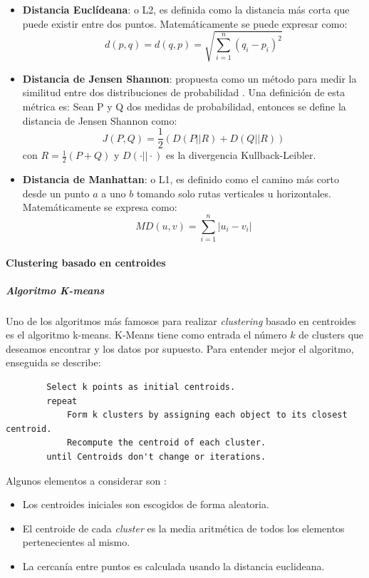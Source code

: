     \begin{itemize}
        \item \textbf{Distancia Euclídeana}: o L2,  es definida como la distancia más corta que puede existir entre dos puntos. Matemáticamente se puede expresar como:
        \begin{equation*}
            d(p,q) = d(q,p) =\sqrt{\sum_{i=1}^n\left(q_i-p_i\right)^2}
        \end{equation*}
        \item \textbf{Distancia de Jensen Shannon}: propuesta como un método para medir la similitud entre dos distribuciones de probabilidad \cite{endres2003new}. Una definición de esta métrica es: Sean P y Q dos medidas de probabilidad, entonces se define la distancia de Jensen Shannon como:
        \begin{equation*}
        J(P,Q) = \frac{1}{2}\left(D(P||R)+D(Q||R)\right)
        \end{equation*}
        con $R=\frac{1}{2}(P+Q)$ y $D(\cdot||\cdot)$ es la divergencia Kullback-Leibler.
        \item \textbf{Distancia de Manhattan}: o L1, es definido como el camino más corto desde un punto $a$ a uno $b$ tomando solo rutas verticales u horizontales. Matemáticamente se expresa como:
        \begin{equation*}
            MD(u,v) = \sum_{i=1}^n \left|u_i - v_i\right|
        \end{equation*}
    \end{itemize}
    
\paragraph{Clustering basado en centroides}
\subparagraph{Algoritmo K-means}
\subparagraph*{}
    Uno de los algoritmos más famosos para realizar \textit{clustering} basado en centroides es el algoritmo k-means. K-Means tiene como entrada el número $k$ de clusters que deseamos encontrar y los datos por supuesto.  Para entender mejor el algoritmo, enseguida se describe:
    \begin{lstlisting}
        Select k points as initial centroids.
        repeat
            Form k clusters by assigning each object to its closest centroid.
            Recompute the centroid of each cluster.
        until Centroids don't change or iterations.
    \end{lstlisting}
    Algunos elementos a considerar son :
    \begin{itemize}
        \item Los centroides iniciales son escogidos de forma aleatoria.
        \item El centroide de cada \textit{cluster} es la media aritmética de todos los elementos pertenecientes al mismo.
        \item La cercanía entre puntos es calculada usando la distancia euclideana.
    \end{itemize}
